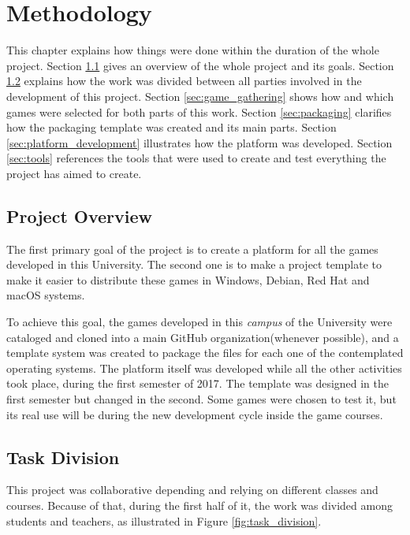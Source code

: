 \chapter{Methodology}
\label{sec:methodology}

This chapter explains how things were done within the duration of the whole project. Section \ref{sec:project_overview} gives an overview of the whole project and its goals. Section \ref{sec:task_division} explains how the work was divided between all parties involved in the development of this project. Section \ref{sec:game_gathering} shows how and which games were selected for both parts of this work. Section \ref{sec:packaging} clarifies how the packaging template was created and its main parts. Section \ref{sec:platform_development} illustrates how the platform was developed. Section \ref{sec:tools} references the tools that were used to create and test everything the project has aimed to create.

\section{Project Overview}
\label{sec:project_overview}

The first primary goal of the project is to create a platform for all the games developed in this University. The second one is to make a project template to make it easier to distribute these games in Windows, Debian, Red Hat and macOS systems.

To achieve this goal, the games developed in this \textit{campus} of the University were cataloged and cloned into a main GitHub organization\footnotemark (whenever possible), and a template system was created to package the files for each one of the contemplated operating systems. The platform itself was developed while all the other activities took place, during the first semester of 2017. The template was designed in the first semester but changed in the second. Some games were chosen to test it, but its real use will be during the new development cycle inside the game courses.


\section{Task Division}
\label{sec:task_division}

This project was collaborative depending and relying on different classes and courses. Because of that, during the first half of it, the work was divided among students and teachers, as illustrated in Figure \ref{fig:task_division}.


